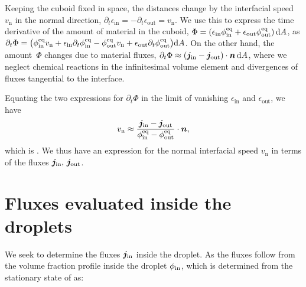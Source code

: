 \begin{appendices}
Keeping the cuboid fixed in space, the distances change by the interfacial speed $v_\mathrm{n}$ in the normal direction, $\partial_t \epsilon_\mathrm{in} = - \partial_t \epsilon_\mathrm{out} = v_\mathrm{n}$.
We use this to express the time derivative of the amount of material in the cuboid, $\Phi = ( \epsilon_\mathrm{in} \phi^\mathrm{eq}_\mathrm{in} + \epsilon_\mathrm{out} \phi^\mathrm{eq}_\mathrm{out} )\, \mathrm{d} A$, as
$    \partial_t {\Phi} = \bigl(
    	\phi^\mathrm{eq}_\mathrm{in} v_\mathrm{n} + \epsilon_\mathrm{in} \partial_t \phi^\mathrm{eq}_\mathrm{in}
	-  \phi^\mathrm{eq}_\mathrm{out} v_\mathrm{n} +  \epsilon_\mathrm{out} \partial_t \phi^\mathrm{eq}_\mathrm{out}
	\bigr) \mathrm{d} A$.
On the other hand, the amount~$\Phi$ changes due to material fluxes, $\partial_t \Phi \approx ( \boldsymbol{j}_\mathrm{in} - \boldsymbol{j}_\mathrm{out}) \cdot \boldsymbol{n} \, \mathrm{d} A$, where we neglect chemical reactions in the infinitesimal volume element and divergences of fluxes tangential to the interface.

Equating the two expressions for $\partial_t \Phi$ in the limit of vanishing $\epsilon_\mathrm{in}$ and $\epsilon_\mathrm{out}$, we have
\begin{equation*}
	v_\mathrm{n} \approx \frac{\boldsymbol{j}_\mathrm{in} - \boldsymbol{j}_\mathrm{out}}{\phi^\mathrm{eq}_\mathrm{in} - \phi^\mathrm{eq}_\mathrm{out}} \cdot \boldsymbol{n},
\end{equation*}
which is .
We thus have an expression for the normal interfacial speed $v_\mathrm{n}$ in terms of the fluxes $\boldsymbol{j}_\mathrm{in}, \, \boldsymbol{j}_\mathrm{out}$.


\chapter{Fluxes evaluated inside the droplets}

\label{sec:fluxes_inside_droplets}

We seek to determine the fluxes $\boldsymbol{j}_\mathrm{in}$ inside the droplet. As the fluxes follow from the volume fraction profile inside the droplet $\phi_\mathrm{in}$, which is determined from the stationary state of  as:


\end{appendices}
